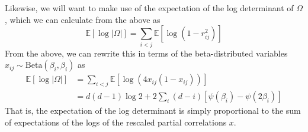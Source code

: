 \documentclass[11pt]{article}
\begin{document}
Likewise, we will want to make use of the expectation of the log determinant of $\Omega$, which we can calculate from the above as
\begin{equation}
    \mathbb{E}[\log |\Omega|] = \sum_{i < j} \mathbb{E}[\log (1 - r_{ij}^2)]
\end{equation}
From the above, we can rewrite this in terms of the beta-distributed variables $x_{ij} \sim \mathrm{Beta}(\beta_i, \beta_i)$ as
\begin{align}
    \label{Elogdet_Omega}
    \mathbb{E}[\log |\Omega|] &= \sum_{i < j} \mathbb{E}[\log (4x_{ij}(1 - x_{ij}))] \\
    &= d(d - 1) \log 2 + 2\sum_{i} (d - i)[\psi(\beta_i) - \psi(2\beta_i)]
\end{align}
That is, the expectation of the log determinant is simply proportional to the sum of expectations of the logs of the rescaled partial correlations $x$.
\end{document}
